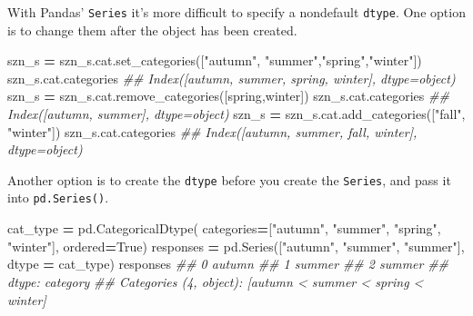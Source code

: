 \documentclass[
  12pt,
  krantz2]{krantz}
\makeatletter
\newenvironment{Shaded}{\begin{snugshade}}{\end{snugshade}}
\newcommand{\CommentTok}[1]{\textcolor[rgb]{0.37,0.37,0.37}{\textit{#1}}}
\newcommand{\NormalTok}[1]{#1}
\newcommand{\OperatorTok}[1]{\textcolor[rgb]{0.43,0.43,0.43}{\textbf{#1}}}
\newcommand{\StringTok}[1]{\textcolor[rgb]{0.5,0.5,0.5}{#1}}
\newcommand{\VariableTok}[1]{\textcolor[rgb]{0,0,0}{#1}}
\newenvironment{kframe}{%
\medskip{}
\setlength{\fboxsep}{.8em}
 \def\at@end@of@kframe{}%
 \ifinner\ifhmode%
  \def\at@end@of@kframe{\end{minipage}}%
  \begin{minipage}{\columnwidth}%
 \fi\fi%
 \def\FrameCommand##1{\hskip\@totalleftmargin \hskip-\fboxsep
 \colorbox{shadecolor}{##1}\hskip-\fboxsep
     \hskip-\linewidth \hskip-\@totalleftmargin \hskip\columnwidth}%
 \MakeFramed {\advance\hsize-\width
   \@totalleftmargin\z@ \linewidth\hsize
   \@setminipage}}%
 {\par\unskip\endMakeFramed%
 \at@end@of@kframe}
\renewenvironment{Shaded}{\begin{kframe}}{\end{kframe}}
\makeatother
\begin{document}
With Pandas' \texttt{Series} it's more difficult to specify a nondefault \texttt{dtype}. One option is to change them after the object has been created.

\begin{Shaded}
\begin{Highlighting}[]
\NormalTok{szn\_s }\OperatorTok{=}\NormalTok{ szn\_s.cat.set\_categories([}\StringTok{"autumn"}\NormalTok{, }\StringTok{"summer"}\NormalTok{,}\StringTok{"spring"}\NormalTok{,}\StringTok{"winter"}\NormalTok{])}
\NormalTok{szn\_s.cat.categories}
\CommentTok{\#\# Index([\textquotesingle{}autumn\textquotesingle{}, \textquotesingle{}summer\textquotesingle{}, \textquotesingle{}spring\textquotesingle{}, \textquotesingle{}winter\textquotesingle{}], dtype=\textquotesingle{}object\textquotesingle{})}
\NormalTok{szn\_s }\OperatorTok{=}\NormalTok{ szn\_s.cat.remove\_categories([}\StringTok{\textquotesingle{}spring\textquotesingle{}}\NormalTok{,}\StringTok{\textquotesingle{}winter\textquotesingle{}}\NormalTok{])}
\NormalTok{szn\_s.cat.categories}
\CommentTok{\#\# Index([\textquotesingle{}autumn\textquotesingle{}, \textquotesingle{}summer\textquotesingle{}], dtype=\textquotesingle{}object\textquotesingle{})}
\NormalTok{szn\_s }\OperatorTok{=}\NormalTok{ szn\_s.cat.add\_categories([}\StringTok{"fall"}\NormalTok{, }\StringTok{"winter"}\NormalTok{])}
\NormalTok{szn\_s.cat.categories}
\CommentTok{\#\# Index([\textquotesingle{}autumn\textquotesingle{}, \textquotesingle{}summer\textquotesingle{}, \textquotesingle{}fall\textquotesingle{}, \textquotesingle{}winter\textquotesingle{}], dtype=\textquotesingle{}object\textquotesingle{})}
\end{Highlighting}
\end{Shaded}

Another option is to create the \texttt{dtype} before you create the \texttt{Series}, and pass it into \texttt{pd.Series()}.

\begin{Shaded}
\begin{Highlighting}[]
\NormalTok{cat\_type }\OperatorTok{=}\NormalTok{ pd.CategoricalDtype(}
\NormalTok{                  categories}\OperatorTok{=}\NormalTok{[}\StringTok{"autumn"}\NormalTok{, }\StringTok{"summer"}\NormalTok{, }\StringTok{"spring"}\NormalTok{, }\StringTok{"winter"}\NormalTok{],}
\NormalTok{                  ordered}\OperatorTok{=}\VariableTok{True}\NormalTok{)}
\NormalTok{responses }\OperatorTok{=}\NormalTok{ pd.Series([}\StringTok{"autumn"}\NormalTok{, }\StringTok{"summer"}\NormalTok{, }\StringTok{"summer"}\NormalTok{], dtype }\OperatorTok{=}\NormalTok{ cat\_type)}
\NormalTok{responses}
\CommentTok{\#\# 0    autumn}
\CommentTok{\#\# 1    summer}
\CommentTok{\#\# 2    summer}
\CommentTok{\#\# dtype: category}
\CommentTok{\#\# Categories (4, object): [\textquotesingle{}autumn\textquotesingle{} \textless{} \textquotesingle{}summer\textquotesingle{} \textless{} \textquotesingle{}spring\textquotesingle{} \textless{} \textquotesingle{}winter\textquotesingle{}]}
\end{Highlighting}
\end{Shaded}
\end{document}
